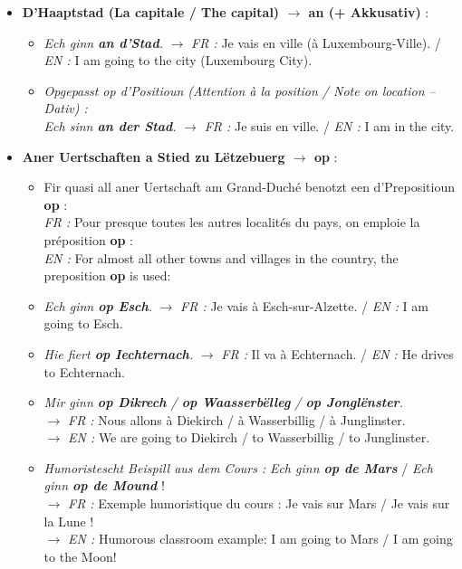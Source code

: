 \begin{itemize}
    \item \textbf{D'Haaptstad (La capitale / The capital) $\rightarrow$ an (+ Akkusativ)} :
    \begin{itemize}
        \item \textit{Ech ginn \textbf{an d'Stad}.} $\rightarrow$ \textit{FR :} Je vais en ville (à Luxembourg-Ville). / \textit{EN :} I am going to the city (Luxembourg City).
        \item \textit{Opgepasst op d'Positioun (Attention à la position / Note on location -- Dativ) :} \\
        \textit{Ech sinn \textbf{an der Stad}.} $\rightarrow$ \textit{FR :} Je suis en ville. / \textit{EN :} I am in the city.
    \end{itemize}

    \vspace{0.4em}

    \item \textbf{Aner Uertschaften a Stied zu Lëtzebuerg $\rightarrow$ op} :
    \begin{itemize}
        \item Fir quasi all aner Uertschaft am Grand-Duché benotzt een d'Prepositioun \textbf{op} : \\
        \textit{FR :} Pour presque toutes les autres localités du pays, on emploie la préposition \textbf{op} : \\
        \textit{EN :} For almost all other towns and villages in the country, the preposition \textbf{op} is used:
        \item \textit{Ech ginn \textbf{op Esch}.} $\rightarrow$ \textit{FR :} Je vais à Esch-sur-Alzette. / \textit{EN :} I am going to Esch.
        \item \textit{Hie fiert \textbf{op Iechternach}.} $\rightarrow$ \textit{FR :} Il va à Echternach. / \textit{EN :} He drives to Echternach.
        \item \textit{Mir ginn \textbf{op Dikrech} / \textbf{op Waasserbëlleg} / \textbf{op Jonglënster}.} \\
        $\rightarrow$ \textit{FR :} Nous allons à Diekirch / à Wasserbillig / à Junglinster. \\
        $\rightarrow$ \textit{EN :} We are going to Diekirch / to Wasserbillig / to Junglinster.
        \item \textit{Humoristescht Beispill aus dem Cours :} \textit{Ech ginn \textbf{op de Mars}} / \textit{Ech ginn \textbf{op de Mound}} ! \\
        $\rightarrow$ \textit{FR :} Exemple humoristique du cours : Je vais sur Mars / Je vais sur la Lune ! \\
        $\rightarrow$ \textit{EN :} Humorous classroom example: I am going to Mars / I am going to the Moon!
    \end{itemize}


\end{itemize}
